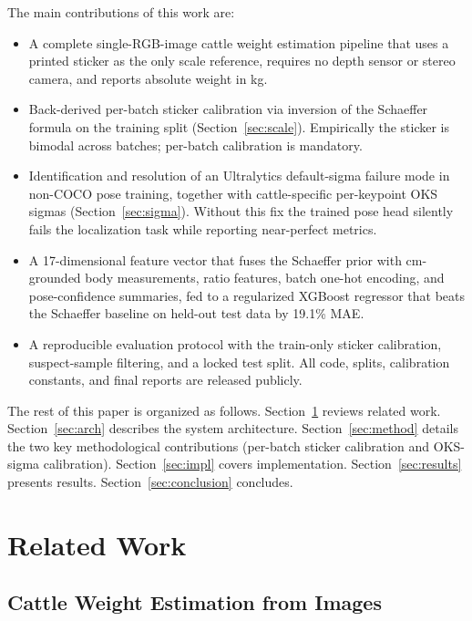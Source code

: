 \documentclass[conference]{IEEEtran}
\begin{document}
The main contributions of this work are:
\begin{itemize}
    \item A complete single-RGB-image cattle weight estimation pipeline that uses a printed sticker as the only scale reference, requires no depth sensor or stereo camera, and reports absolute weight in kg.
    \item Back-derived per-batch sticker calibration via inversion of the Schaeffer formula on the training split (Section~\ref{sec:scale}). Empirically the sticker is bimodal across batches; per-batch calibration is mandatory.
    \item Identification and resolution of an Ultralytics default-sigma failure mode in non-COCO pose training, together with cattle-specific per-keypoint OKS sigmas (Section~\ref{sec:sigma}). Without this fix the trained pose head silently fails the localization task while reporting near-perfect metrics.
    \item A 17-dimensional feature vector that fuses the Schaeffer prior with cm-grounded body measurements, ratio features, batch one-hot encoding, and pose-confidence summaries, fed to a regularized XGBoost regressor that beats the Schaeffer baseline on held-out test data by 19.1\% MAE.
    \item A reproducible evaluation protocol with the train-only sticker calibration, suspect-sample filtering, and a locked test split. All code, splits, calibration constants, and final reports are released publicly.
\end{itemize}

The rest of this paper is organized as follows. Section~\ref{sec:related} reviews related work. Section~\ref{sec:arch} describes the system architecture. Section~\ref{sec:method} details the two key methodological contributions (per-batch sticker calibration and OKS-sigma calibration). Section~\ref{sec:impl} covers implementation. Section~\ref{sec:results} presents results. Section~\ref{sec:conclusion} concludes.

\section{Related Work}
\label{sec:related}

\subsection{Cattle Weight Estimation from Images}
\end{document}
